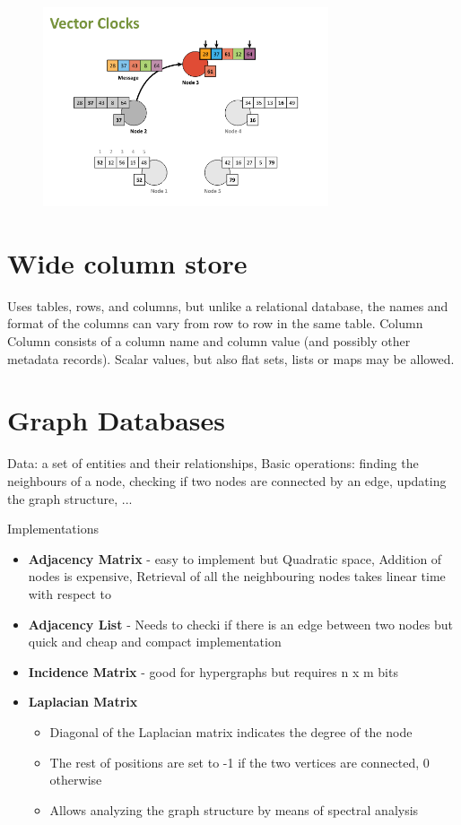 \begin{figure}[ht!]
\centering
\includegraphics[width=0.75\textwidth]{oborove/DS2/img/vector_clock.png}
\end{figure}


\section{Wide column store}
Uses tables, rows, and columns, but unlike a relational database, the names and format of the columns can vary from row to row in the same table. Column
Column consists of a column name and column value (and possibly other metadata records). Scalar values, but also flat sets, lists or maps may be allowed.

\section{Graph Databases}
Data: a set of entities and their relationships, Basic operations: finding the neighbours of a node, checking if two nodes are connected by an edge, updating the graph structure, ... 

Implementations
\begin{itemize}
    \item \textbf{Adjacency Matrix} - easy to implement but Quadratic space, Addition of nodes is expensive, Retrieval of all the neighbouring nodes takes linear time with respect to
    \item \textbf{Adjacency List} - Needs to checki if there is an edge between two nodes but quick and cheap and compact implementation
    \item \textbf{Incidence Matrix} - good for hypergraphs but requires n x m bits
    \item \textbf{Laplacian Matrix}
    \begin{itemize}
        \item Diagonal of the Laplacian matrix indicates the degree of the node
        \item The rest of positions are set to -1 if the two vertices are connected, 0 otherwise
        \item Allows analyzing the graph structure by means of spectral analysis
    \end{itemize}
\end{itemize}

